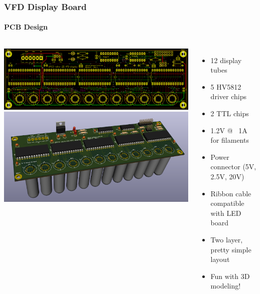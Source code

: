 \documentclass{beamer}
\begin{document}
\begin{frame}
  \frametitle{VFD Display Board}
  \framesubtitle{PCB Design}
  \begin{columns}
    \includegraphics[width=\textwidth]{figs/vfd-layout.jpg} \\ 
    \vskip 0.2in
    \includegraphics[width=\textwidth]{figs/render_board.png}
    \begin{itemize}
    \scriptsize
    \item 12 display tubes
    \item 5 HV5812 driver chips
    \item 2 TTL chips
    \item 1.2V @ ~1A for filaments
    \item Power connector (5V, 2.5V, 20V)
    \item Ribbon cable compatible with LED board
    \item Two layer, pretty simple layout
    \item Fun with 3D modeling!
    \end{itemize}
  \end{columns}
\end{frame}
\end{document}
